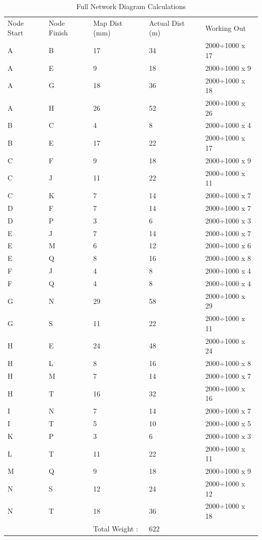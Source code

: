 \documentclass[11pt]{book}
\renewcommand{\=}[1]{\stackrel{#1}{=}} %
\theoremstyle{definition}
\theoremstyle{remark}
\begin{document}
\begin{table}[]
\begin{tabular}{lllll}
Node Start & Node Finish & Map Dist (mm) & Actual Dist (m) & Working Out \\
A & B & 17 & 34 & 2000÷1000 x 17 \\
A & E & 9 & 18 & 2000÷1000 x 9 \\
A & G & 18 & 36 & 2000÷1000 x 18 \\
A & H & 26 & 52 & 2000÷1000 x 26 \\
B & C & 4 & 8 & 2000÷1000 x 4 \\
B & E & 17 & 22 & 2000÷1000 x 17 \\
C & F & 9 & 18 & 2000÷1000 x 9 \\
C & J & 11 & 22 & 2000÷1000 x 11 \\
C & K & 7 & 14 & 2000÷1000 x 7 \\
D & F & 7 & 14 & 2000÷1000 x 7 \\
D & P & 3 & 6 & 2000÷1000 x 3 \\
E & J & 7 & 14 & 2000÷1000 x 7 \\
E & M & 6 & 12 & 2000÷1000 x 6 \\
E & Q & 8 & 16 & 2000÷1000 x 8 \\
F & J & 4 & 8 & 2000÷1000 x 4 \\
F & Q & 4 & 8 & 2000÷1000 x 4 \\
G & N & 29 & 58 & 2000÷1000 x 29 \\
G & S & 11 & 22 & 2000÷1000 x 11 \\
H & E & 24 & 48 & 2000÷1000 x 24 \\
H & L & 8 & 16 & 2000÷1000 x 8 \\
H & M & 7 & 14 & 2000÷1000 x 7 \\
H & T & 16 & 32 & 2000÷1000 x 16 \\
I & N & 7 & 14 & 2000÷1000 x 7 \\
I & T & 5 & 10 & 2000÷1000 x 5 \\
K & P & 3 & 6 & 2000÷1000 x 3 \\
L & T & 11 & 22 & 2000÷1000 x 11 \\
M & Q & 9 & 18 & 2000÷1000 x 9 \\
N & S & 12 & 24 & 2000÷1000 x 12 \\
N & T & 18 & 36 & 2000÷1000 x 18 \\
  &   & Total Weight :& 622 &
\end{tabular}
\caption{Full Network Diagram Calculations}
\label{tab:my-table}
\end{table}
\end{document}
